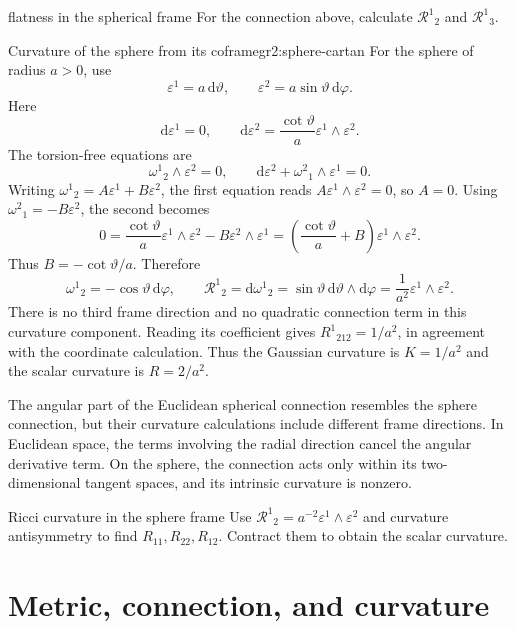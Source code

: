 \documentclass[11pt,a4paper]{article}
\numberwithin{equation}{section}
\newcommand{\dd}{\mathrm d}
\newcommand{\slideref}[1]{\par\nobreak\smallskip\nobreak{\footnotesize\color{ink!60}\textsc{Source slide #1}}\par\nobreak\smallskip\nobreak}
\begin{document}
\begin{studentwork}[2.5cm]{flatness in the spherical frame}
For the connection above, calculate
\(\mathcal R^1{}_2\) and \(\mathcal R^1{}_3\).
\end{studentwork}

\begin{examplebox}{Curvature of the sphere from its coframe}{gr2:sphere-cartan}
For the sphere of radius \(a>0\), use
\[
 \varepsilon^1=a\,\dd\vartheta,\qquad
 \varepsilon^2=a\sin\vartheta\,\dd\varphi.
\]
Here
\[
 \dd\varepsilon^1=0,\qquad
 \dd\varepsilon^2=\frac{\cot\vartheta}{a}
                          \varepsilon^1\wedge\varepsilon^2.
\]
The torsion-free equations are
\[
 \omega^1{}_2\wedge\varepsilon^2=0,\qquad
 \dd\varepsilon^2+\omega^2{}_1\wedge\varepsilon^1=0.
\]
Writing \(\omega^1{}_2=A\varepsilon^1+B\varepsilon^2\), the first
equation reads \(A\varepsilon^1\wedge\varepsilon^2=0\), so \(A=0\).
Using \(\omega^2{}_1=-B\varepsilon^2\), the second becomes
\[
 0=\frac{\cot\vartheta}{a}\varepsilon^1\wedge\varepsilon^2
      -B\varepsilon^2\wedge\varepsilon^1
   =\left(\frac{\cot\vartheta}{a}+B\right)
      \varepsilon^1\wedge\varepsilon^2.
\]
Thus \(B=-\cot\vartheta/a\). Therefore
\[
 \omega^1{}_2=-\cos\vartheta\,\dd\varphi,
 \qquad
 \mathcal R^1{}_2=\dd\omega^1{}_2
 =\sin\vartheta\,\dd\vartheta\wedge\dd\varphi
 =\frac1{a^2}\varepsilon^1\wedge\varepsilon^2.
\]
There is no third frame direction and no quadratic connection term
in this curvature component. Reading its coefficient gives
\(R^1{}_{212}=1/a^2\), in agreement with the coordinate calculation.
Thus the Gaussian curvature is \(K=1/a^2\) and the scalar curvature
is \(R=2/a^2\).
\end{examplebox}

The angular part of the Euclidean spherical connection resembles
the sphere connection, but their curvature calculations include
different frame directions. In Euclidean space, the terms involving
the radial direction cancel the angular derivative term. On the
sphere, the connection acts only within its two-dimensional tangent
spaces, and its intrinsic curvature is nonzero.

\begin{studentwork}[2.5cm]{Ricci curvature in the sphere frame}
Use \(\mathcal R^1{}_2=a^{-2}\varepsilon^1\wedge\varepsilon^2\)
and curvature antisymmetry to find \(R_{11},R_{22},R_{12}\).
Contract them to obtain the scalar curvature.
\end{studentwork}

\section{Metric, connection, and curvature}
\slideref{20}
\end{document}
